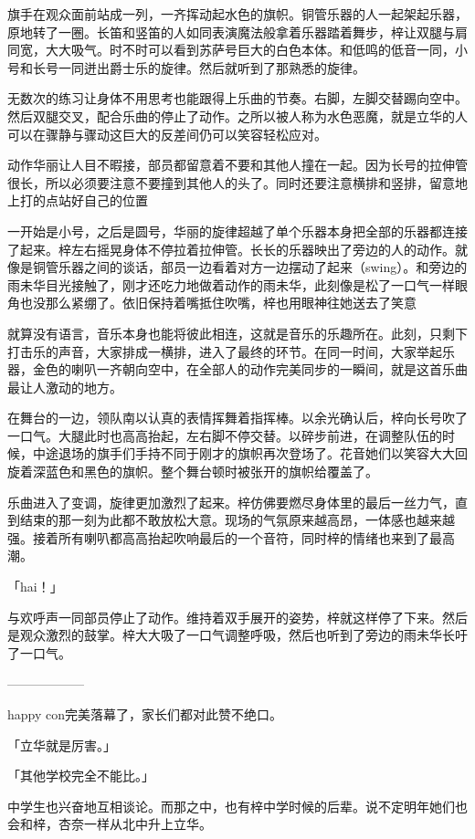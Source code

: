 \documentclass[UTF8]{ctexart}
\begin{document}
    旗手在观众面前站成一列，一齐挥动起水色的旗帜。铜管乐器的人一起架起乐器，原地转了一圈。长笛和竖笛的人如同表演魔法般拿着乐器踏着舞步，梓让双腿与肩同宽，大大吸气。时不时可以看到苏萨号巨大的白色本体。和低鸣的低音一同，小号和长号一同迸出爵士乐的旋律。然后就听到了那熟悉的旋律。

    无数次的练习让身体不用思考也能跟得上乐曲的节奏。右脚，左脚交替踢向空中。然后双腿交叉，配合乐曲的停止了动作。之所以被人称为水色恶魔，就是立华的人可以在骤静与骤动这巨大的反差间仍可以笑容轻松应对。

    动作华丽让人目不暇接，部员都留意着不要和其他人撞在一起。因为长号的拉伸管很长，所以必须要注意不要撞到其他人的头了。同时还要注意横排和竖排，留意地上打的点站好自己的位置

    一开始是小号，之后是圆号，华丽的旋律超越了单个乐器本身把全部的乐器都连接了起来。梓左右摇晃身体不停拉着拉伸管。长长的乐器映出了旁边的人的动作。就像是铜管乐器之间的谈话，部员一边看着对方一边摆动了起来（swing）。和旁边的雨未华目光接触了，刚才还吃力地做着动作的雨未华，此刻像是松了一口气一样眼角也没那么紧绷了。依旧保持着嘴抵住吹嘴，梓也用眼神往她送去了笑意

    就算没有语言，音乐本身也能将彼此相连，这就是音乐的乐趣所在。此刻，只剩下打击乐的声音，大家排成一横排，进入了最终的环节。在同一时间，大家举起乐器，金色的喇叭一齐朝向空中，在全部人的动作完美同步的一瞬间，就是这首乐曲最让人激动的地方。

    在舞台的一边，领队南以认真的表情挥舞着指挥棒。以余光确认后，梓向长号吹了一口气。大腿此时也高高抬起，左右脚不停交替。以碎步前进，在调整队伍的时候，中途退场的旗手们手持不同于刚才的旗帜再次登场了。花音她们以笑容大大回旋着深蓝色和黑色的旗帜。整个舞台顿时被张开的旗帜给覆盖了。

    乐曲进入了变调，旋律更加激烈了起来。梓仿佛要燃尽身体里的最后一丝力气，直到结束的那一刻为此都不敢放松大意。现场的气氛原来越高昂，一体感也越来越强。接着所有喇叭都高高抬起吹响最后的一个音符，同时梓的情绪也来到了最高潮。

    「hai！」

    与欢呼声一同部员停止了动作。维持着双手展开的姿势，梓就这样停了下来。然后是观众激烈的鼓掌。梓大大吸了一口气调整呼吸，然后也听到了旁边的雨未华长吁了一口气。

    ——————

    happy con完美落幕了，家长们都对此赞不绝口。

    「立华就是厉害。」

    「其他学校完全不能比。」

    中学生也兴奋地互相谈论。而那之中，也有梓中学时候的后辈。说不定明年她们也会和梓，杏奈一样从北中升上立华。
\end{document}
